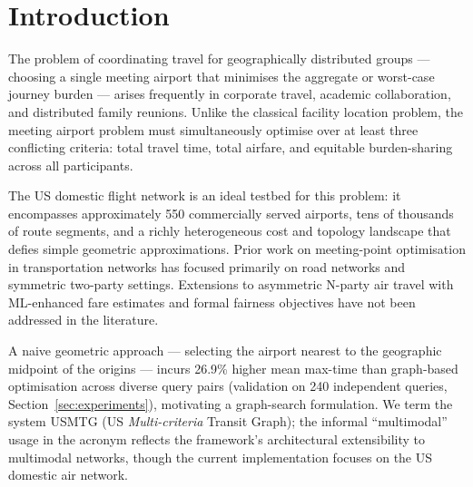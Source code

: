 \documentclass[review]{elsarticle}
\begin{document}
\section{Introduction}

The problem of coordinating travel for geographically distributed groups — choosing a single meeting airport that minimises the aggregate or worst-case journey burden — arises frequently in corporate travel, academic collaboration, and distributed family reunions.
Unlike the classical facility location problem, the meeting airport problem must simultaneously optimise over at least three conflicting criteria: total travel time, total airfare, and equitable burden-sharing across all participants.

The US domestic flight network is an ideal testbed for this problem: it encompasses approximately 550 commercially served airports, tens of thousands of route segments, and a richly heterogeneous cost and topology landscape that defies simple geometric approximations.
Prior work on meeting-point optimisation in transportation networks has focused primarily on road networks \cite{li2016} and symmetric two-party settings.
Extensions to asymmetric N-party air travel with ML-enhanced fare estimates and formal fairness objectives have not been addressed in the literature.

A naive geometric approach --- selecting the airport nearest to the geographic midpoint of the origins --- incurs 26.9\% higher mean max-time than graph-based optimisation across diverse query pairs (validation on 240 independent queries, Section~\ref{sec:experiments}), motivating a graph-search formulation.
We term the system USMTG (US \textit{Multi-criteria} Transit Graph); the informal ``multimodal'' usage in the acronym reflects the framework's architectural extensibility to multimodal networks, though the current implementation focuses on the US domestic air network.
\end{document}

